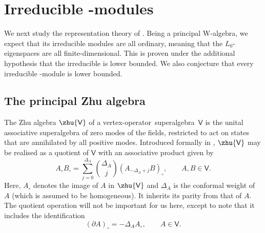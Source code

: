 \documentclass[pdftex]{sigma}
\numberwithin{equation}{section}
\newcommand{\pd}{\partial} %
\newcommand{\kk}{\mathsf{k}} %
\newcommand{\VOA}[1]{\mathsf{#1}} %
\newcommand{\uwalg}[2]{\VOA{W}^{#1}_{\mathrm{#2}}} %
\newcommand{\upr}[1][\kk]{\uwalg{#1}{pr}} %
\newcommand{\zh}[1]{#1_{\circ}} %
\newcommand{\fdim}{finite-dimensional}
\newcommand{\vo}{vertex-operator}
\newcommand{\svoa}{\vo\ superalgebra}
\begin{document}
\section[Irreducible upr-modules]{Irreducible \smash{$\boldsymbol{\upr}$}-modules} \label{sec:reps}

We next study the representation theory of \smash{$\upr$}.
Being a principal W-algebra, we expect that its irreducible modules are all ordinary, meaning that the $L_0$-eigenspaces are all \fdim.
This is proven under the additional hypothesis that the irreducible is lower bounded.
We also conjecture that every irreducible \smash{$\upr$}-module is lower bounded.

\subsection{The principal Zhu algebra} \label{sec:zhu}

The Zhu algebra $\zhu{\VOA{V}}$ of a \svoa\ $\VOA{V}$ is the unital associative superalgebra of zero modes of the fields, restricted to act on states that are annihilated by all positive modes.
Introduced formally in \cite{KacVer93,ZhuMod96}, $\zhu{\VOA{V}}$ may be realised as a quotient of $\VOA{V}$ with an associative product given by
\begin{equation} \label{eq:zhudef}
	\zh{A} \zh{B} = \sum_{j=0}^{\Delta_A} \binom{\Delta_A}{j} \zh{(A_{-\Delta_A+j}B)}, \qquad A,B \in \VOA{V}.
\end{equation}
Here, $\zh{A}$ denotes the image of $A$ in $\zhu{\VOA{V}}$ and $\Delta_A$ is the conformal weight of $A$ (which is assumed to be homogeneous).
It inherits its parity from that of $A$.
The quotient operation will not be important for us here, except to note that it includes the identification
\begin{equation} \label{eq:zhuid}
	\zh{(\pd A)} = -\Delta_A \zh{A}, \qquad A \in \VOA{V}.
\end{equation}
\end{document}
